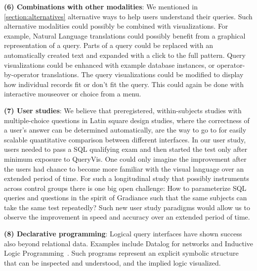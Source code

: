 \documentclass[letterpaper,11pt]{article}
\newcommand{\queryvis}{\textsf{QueryVis}\xspace}
\begin{document}
\textbf{(6) Combinations with other modalities}:
We mentioned in \autoref{section:alternatives} alternative ways to help users understand their queries.
Such alternative modalities could possibly be combined with visualizations.
For example, Natural Language translations could possibly benefit from a graphical representation of a query.
Parts of a query could be replaced with an automatically created text and expanded with a click to the full pattern.
Query visualizations could be enhanced with example database instances, or operator-by-operator translations.
The query visualizations could be modified to display how individual records fit or don’t fit the query. 
This could again be done with interactive mouseover or choice from a menu.



\textbf{(7) User studies}: 
We believe that preregistered, within-subjects studies with multiple-choice questions in Latin square design studies, 
where the correctness of a user's answer can be determined automatically,
are the way to go to for easily scalable quantitative comparison between different interfaces. 
In our user study, users needed to pass a SQL qualifying exam and then started the test only after minimum exposure to \queryvis. 
One could only imagine the improvement after the users had chance to become more familiar with the visual language over an extended period of time.
For such a longitudinal study that possibly instruments across control groups there is one big open challenge:
How to parameterize SQL queries and questions in the spirit of Gradiance
\cite{gradiance}
such that the same subjects can take the same test repeatedly?
Such new user study paradigms would allow us 
to observe the improvement in speed and accuracy over an extended period of time.


%

%



%
%
%
%
%
%
%
%
%
%






\textbf{(8) Declarative programming}:
Logical query interfaces have shown success also beyond relational data.
Examples include Datalog for networks
\cite{DBLP:conf/sigmod/HuangGL11,DBLP:journals/cacm/LooCGGHMRRS09,DBLP:conf/sosp/LooCHMRS05}
and Inductive Logic Programming~\cite{SchmidMuggleton:2017}. 
Such programs represent an explicit symbolic structure that can be inspected and understood, and the implied logic visualized.
\end{document}
